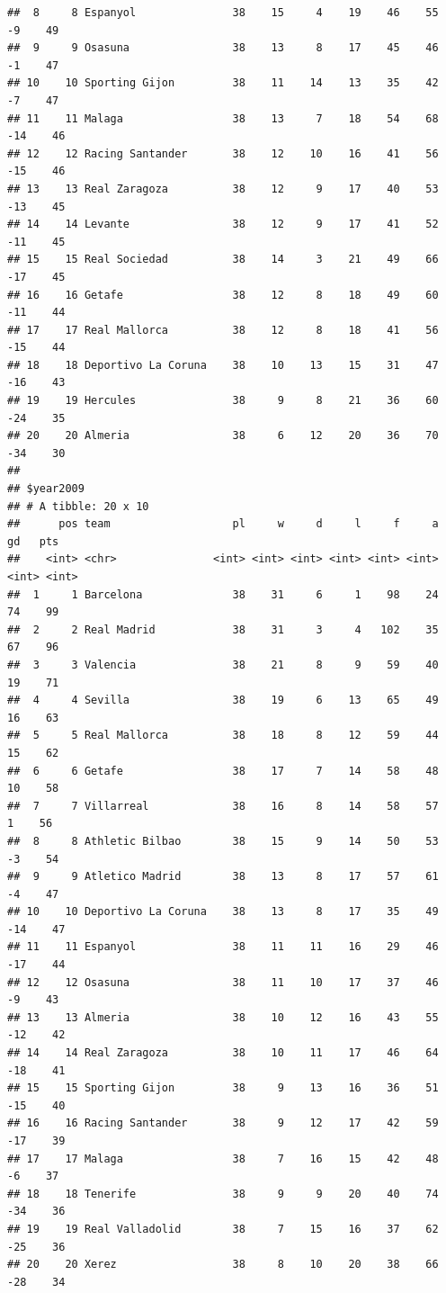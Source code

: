 \documentclass[]{tufte-handout}
\begin{document}
\begin{verbatim}
##  8     8 Espanyol               38    15     4    19    46    55    -9    49
##  9     9 Osasuna                38    13     8    17    45    46    -1    47
## 10    10 Sporting Gijon         38    11    14    13    35    42    -7    47
## 11    11 Malaga                 38    13     7    18    54    68   -14    46
## 12    12 Racing Santander       38    12    10    16    41    56   -15    46
## 13    13 Real Zaragoza          38    12     9    17    40    53   -13    45
## 14    14 Levante                38    12     9    17    41    52   -11    45
## 15    15 Real Sociedad          38    14     3    21    49    66   -17    45
## 16    16 Getafe                 38    12     8    18    49    60   -11    44
## 17    17 Real Mallorca          38    12     8    18    41    56   -15    44
## 18    18 Deportivo La Coruna    38    10    13    15    31    47   -16    43
## 19    19 Hercules               38     9     8    21    36    60   -24    35
## 20    20 Almeria                38     6    12    20    36    70   -34    30
## 
## $year2009
## # A tibble: 20 x 10
##      pos team                   pl     w     d     l     f     a    gd   pts
##    <int> <chr>               <int> <int> <int> <int> <int> <int> <int> <int>
##  1     1 Barcelona              38    31     6     1    98    24    74    99
##  2     2 Real Madrid            38    31     3     4   102    35    67    96
##  3     3 Valencia               38    21     8     9    59    40    19    71
##  4     4 Sevilla                38    19     6    13    65    49    16    63
##  5     5 Real Mallorca          38    18     8    12    59    44    15    62
##  6     6 Getafe                 38    17     7    14    58    48    10    58
##  7     7 Villarreal             38    16     8    14    58    57     1    56
##  8     8 Athletic Bilbao        38    15     9    14    50    53    -3    54
##  9     9 Atletico Madrid        38    13     8    17    57    61    -4    47
## 10    10 Deportivo La Coruna    38    13     8    17    35    49   -14    47
## 11    11 Espanyol               38    11    11    16    29    46   -17    44
## 12    12 Osasuna                38    11    10    17    37    46    -9    43
## 13    13 Almeria                38    10    12    16    43    55   -12    42
## 14    14 Real Zaragoza          38    10    11    17    46    64   -18    41
## 15    15 Sporting Gijon         38     9    13    16    36    51   -15    40
## 16    16 Racing Santander       38     9    12    17    42    59   -17    39
## 17    17 Malaga                 38     7    16    15    42    48    -6    37
## 18    18 Tenerife               38     9     9    20    40    74   -34    36
## 19    19 Real Valladolid        38     7    15    16    37    62   -25    36
## 20    20 Xerez                  38     8    10    20    38    66   -28    34
\end{verbatim}
\end{document}
